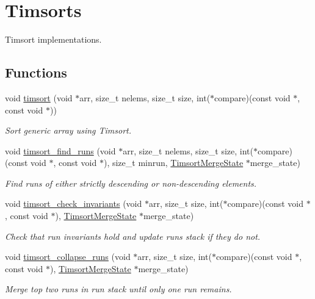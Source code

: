 \hypertarget{group__Timsort}{}\section{Timsorts}
\label{group__Timsort}


Timsort implementations.  


\subsection*{Functions}
\begin{DoxyCompactItemize}
\item 
void \hyperlink{group__Timsort_ga1c9fca70060e37617156b89b387aa4d3}{timsort} (void $\ast$arr, size\+\_\+t nelems, size\+\_\+t size, int($\ast$compare)(const void $\ast$, const void $\ast$))
\begin{DoxyCompactList}\small\item\em Sort generic array using Timsort. \end{DoxyCompactList}\item 
void \hyperlink{group__Timsort_gabdbb9c8c9cff36ac260a15b51080e47b}{timsort\+\_\+find\+\_\+runs} (void $\ast$arr, size\+\_\+t nelems, size\+\_\+t size, int($\ast$compare)(const void $\ast$, const void $\ast$), size\+\_\+t minrun, \hyperlink{structTimsortMergeState}{Timsort\+Merge\+State} $\ast$merge\+\_\+state)
\begin{DoxyCompactList}\small\item\em Find runs of either strictly descending or non-\/descending elements. \end{DoxyCompactList}\item 
void \hyperlink{group__Timsort_ga77b690ab2bb67a139ba32a6715834952}{timsort\+\_\+check\+\_\+invariants} (void $\ast$arr, size\+\_\+t size, int($\ast$compare)(const void $\ast$, const void $\ast$), \hyperlink{structTimsortMergeState}{Timsort\+Merge\+State} $\ast$merge\+\_\+state)
\begin{DoxyCompactList}\small\item\em Check that run invariants hold and update runs stack if they do not. \end{DoxyCompactList}\item 
void \hyperlink{group__Timsort_ga3978be9f06411c3f9cd0bd597d64b555}{timsort\+\_\+collapse\+\_\+runs} (void $\ast$arr, size\+\_\+t size, int($\ast$compare)(const void $\ast$, const void $\ast$), \hyperlink{structTimsortMergeState}{Timsort\+Merge\+State} $\ast$merge\+\_\+state)
\begin{DoxyCompactList}\small\item\em Merge top two runs in run stack until only one run remains. \end{DoxyCompactList}\item 

\end{DoxyCompactItemize}
